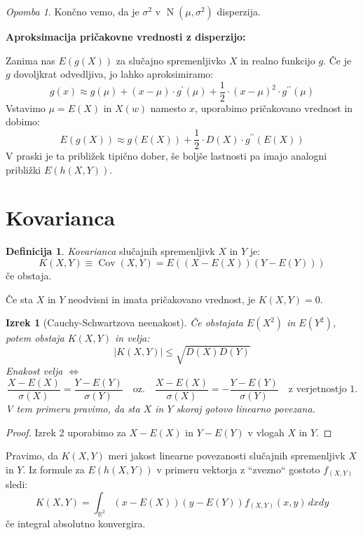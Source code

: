 \documentclass[12pt]{book}
\def\n{\noindent}
\def\s{\vspace{10pt}}
\theoremstyle{definition}
\newtheorem{definicija}{Definicija}
\theoremstyle{plain}
\newtheorem{izrek}{Izrek}
\theoremstyle{plain}
\theoremstyle{plain}
\theoremstyle{remark}
\newtheorem*{opomba}{Opomba}
\begin{document}
\begin{opomba}
    Končno vemo, da je $\sigma^2$ v $\operatorname{N}\left(\mu, \sigma^2\right)$ disperzija. 
\end{opomba}

\s

\n \textbf{Aproksimacija pričakovne vrednosti z disperzijo:}

\n Zanima nas $E(g(X))$ za slučajno spremenljivko $X$ in realno funkcijo $g$. Če je $g$ dovoljkrat odvedljiva, jo lahko aproksimiramo:
$$
g(x) \approx g(\mu)+(x-\mu) \cdot g^{\prime}(\mu)+\frac{1}{2} \cdot(x-\mu)^2 \cdot g^{\prime \prime}(\mu)
$$
Vstavimo $\mu=E(X)$ in $X(w)$ namesto $x$, uporabimo pričakovano vrednost in dobimo: 
$$
E(g(X)) \approx g(E(X))+\frac{1}{2} \cdot D(X) \cdot g^{\prime \prime}(E(X))
$$
V praski je ta približek tipično dober, še boljše lastnosti pa imajo analogni približki $E(h(X,Y))$.

\section{Kovarianca}

\begin{definicija}
    \emph{Kovarianca} slučajnih spremenljivk $X$ in $Y$ je:
    $$
    K(X, Y)\equiv\operatorname{Cov}(X, Y)=E((X-E (X))(Y-E (Y)))
    $$
    če obstaja. 
\end{definicija}

\n Če sta $X$ in $Y$ neodvisni in imata pričakovano vrednost, je $K(X,Y) = 0$.

\begin{izrek}[Cauchy-Schwartzova neenakost]
    Če obstajata $E\left(X^2\right)$ in $E\left(Y^2\right)$, potem obstaja $K(X,Y)$ in velja: 
    $$
    |K(X, Y)| \leq \sqrt{D(X) D(Y)}
    $$
    Enakost velja $\iff$
    $$
    \frac{X-E(X)}{\sigma(X)}=\frac{Y-E(Y)}{\sigma(Y)} \quad \text{oz.} \quad \frac{X-E(X)}{\sigma(X)}=-\frac{Y-E(Y)}{\sigma(Y)} \quad \text{z verjetnostjo 1.}
    $$
    V tem primeru pravimo, da sta $X$ in $Y$ skoraj gotovo linearno povezana. 
\end{izrek}

\begin{proof}
    Izrek 2 uporabimo za $X-E(X)$ in $Y-E(Y)$ v vlogah $X$ in $Y$. 
\end{proof}

\n Pravimo, da $K(X,Y)$ meri jakost linearne povezanosti slučajnih spremenljivk $X$ in $Y$. Iz formule za $E(h(X,Y))$ v primeru vektorja z “zvezno“ gostoto $f_{(X,Y)}$ sledi: 
$$
K(X, Y)=\int_{\mathbb{R}^2}(x-E(X))(y-E(Y)) f_{(X, Y)}(x, y) \,d x d y
$$
če integral absolutno konvergira. 
\end{document}
